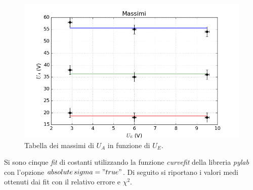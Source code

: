 \documentclass[10pt,a4paper]{article}
\begin{document}
\begin{figure}[!htb]
  \centering
  \includegraphics[scale=.7]{max.png}
\caption{Tabella dei massimi di $U_A$ in funzione di $U_E$.}
\label{graficoMax}
\end{figure}

Si sono cinque \emph{fit} di costanti utilizzando la funzione \emph{curvefit} della libreria \emph{pylab} con l'opzione \emph{$absolute\,sigma = "true"$}. Di seguito si riportano i valori medi ottenuti dai fit con il relativo errore e $\chi^2$.\\
\end{document}
